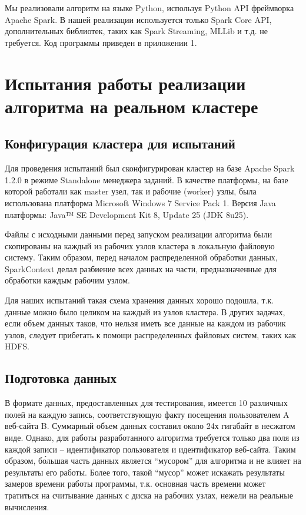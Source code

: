 \documentclass[12pt,a4paper]{report}
\begin{document}
Мы реализовали алгоритм на языке Python, используя Python API фреймворка Apache Spark. В нашей реализации используется только Spark Core API, дополнительных библиотек, таких как Spark Streaming, MLLib и т.д. не требуется. Код программы приведен в приложении 1.

\newpage

\section{Испытания работы реализации алгоритма на реальном кластере}

\subsection{Конфигурация кластера для испытаний}
Для проведения испытаний был сконфигурирован кластер на базе Apache Spark 1.2.0 в режиме Standalone менеджера заданий. В качестве платформы, на базе которой работали как master узел, так и рабочие (worker) узлы, была использована платформа Microsoft Windows 7 Service Pack 1. Версия Java платформы: Java™ SE Development Kit 8, Update 25 (JDK 8u25).

Файлы с исходными данными перед запуском реализации алгоритма были скопированы на каждый из рабочих узлов кластера в локальную файловую систему. Таким образом, перед началом распределенной обработки данных, SparkContext делал разбиение всех данных на части, предназначенные для обработки каждым рабочим узлом.

Для наших испытаний такая схема хранения данных хорошо подошла, т.к. данные можно было целиком на каждый из узлов кластера. В других задачах, если объем данных таков, что нельзя иметь все данные на каждом из рабочик узлов, следует прибегать к помощи распределенных файловых систем, таких как HDFS.

\subsection{Подготовка данных}
В формате данных, предоставленных для тестирования, имеется 10 различных полей на каждую запись, соответствующую факту посещения пользователем A веб-сайта B. Суммарный объем данных составил около 24х гигабайт в несжатом виде. Однако, для работы разработанного алгоритма требуется только два поля из каждой записи -- идентификатор пользователя и идентификатор веб-сайта. Таким образом, б\'{о}льшая часть данных является ``мусором'' для алгоритма и не влияет на результаты его работы. Более того, такой ``мусор'' может искажать результаты замеров времени работы программы, т.к. основная часть времени может тратиться на считывание данных с диска на рабочих узлах, нежели на реальные вычисления.
\end{document}
